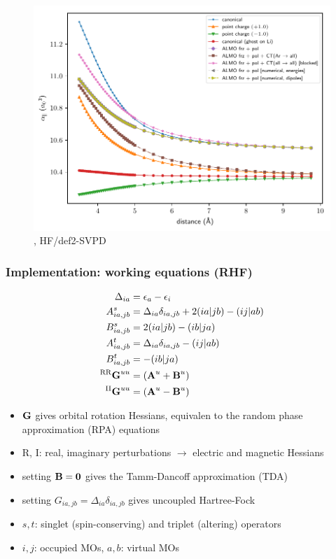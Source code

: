 \documentclass[xcolor=usenames,dvipsnames,svgnames]{beamer}
\newcommand{\arlidimer}{\ce{Ar\bond{....}Li+}}
\begin{document}
\begin{frame}
  \begin{figure}
    \centering
    \includegraphics[width=\linewidth,keepaspectratio]{../paper_04/polar_onaxis_projected_long_def2-SVPD.pdf}
    \caption*{\arlidimer{}, HF/def2-SVPD}
  \end{figure}
\end{frame}

\begin{frame}
  \frametitle{Implementation: working equations (RHF)}
  \begin{align*}
    \Delta_{ia} &= \epsilon_{a} - \epsilon_{i} \\
    A_{ia,jb}^{s} &= \Delta_{ia}\delta_{ia,jb} + 2(ia|jb) - (ij|ab) \\
    B_{ia,jb}^{s} &= 2(ia|jb) - (ib|ja) \\
    A_{ia,jb}^{t} &= \Delta_{ia}\delta_{ia,jb} - (ij|ab) \\
    B_{ia,jb}^{t} &= - (ib|ja) \\
    ^{\text{RR}}\boldsymbol{\mathbf{G}}^{uu} &= (\boldsymbol{\mathbf{A}}^{u} + \boldsymbol{\mathbf{B}}^{u}) \\
    ^{\text{II}}\boldsymbol{\mathbf{G}}^{uu} &= (\boldsymbol{\mathbf{A}}^{u} - \boldsymbol{\mathbf{B}}^{u})
  \end{align*}
  \scriptsize
  \begin{itemize}
  \item \(\boldsymbol{\mathbf{G}}\) gives orbital rotation Hessians, equivalen to the random phase approximation (RPA) equations \\
  \item R, I: real, imaginary perturbations \(\rightarrow\) electric and magnetic Hessians \\
  \item setting \(\boldsymbol{\mathbf{B}} = \boldsymbol{\mathbf{0}}\) gives the Tamm-Dancoff approximation (TDA) \\
  \item setting \( G_{ia,jb} = \Delta_{ia}\delta_{ia,jb} \) gives uncoupled Hartree-Fock \\
  \item \(s,t\): singlet (spin-conserving) and triplet (altering) operators \\
  \item \(i,j\): occupied MOs, \(a,b\): virtual MOs
  \end{itemize}
\end{frame}
\end{document}
